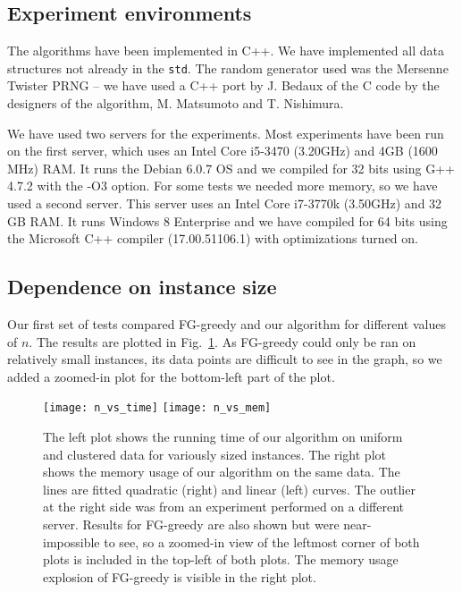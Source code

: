 \documentclass[runningheads,envcountsame,oribibl,orivec]{llncs}
\begin{document}
\subsection{Experiment environments}

The algorithms have been implemented in C++. We have implemented all data structures not already in the \verb|std|. The random generator used was the Mersenne Twister PRNG -- we have used a C++ port by J. Bedaux of the C code by the designers of the algorithm,  M. Matsumoto and T. Nishimura.

We have used two servers for the experiments. Most experiments have been run on the first server, which uses an Intel Core i5-3470 (3.20GHz) and 4GB (1600 MHz) RAM. It runs the Debian 6.0.7 OS and we compiled for 32 bits using G++ 4.7.2 with the -O3 option. For some tests we needed more memory, so we have used a second server. This server uses an Intel Core i7-3770k (3.50GHz) and 32 GB RAM. It runs Windows 8 Enterprise and we have compiled for 64 bits using the Microsoft C++ compiler (17.00.51106.1) with optimizations turned on.

\subsection{Dependence on instance size}

Our first set of tests compared FG-greedy and our algorithm for different values of $n$. The results are plotted in Fig.~\ref{figure:plot}. As FG-greedy could only be ran on relatively small instances, its data points are difficult to see in the graph, so we added a zoomed-in plot for the bottom-left part of the plot.

\begin{figure}[h!]\centering
\texttt{[image: n\_vs\_time]}
\texttt{[image: n\_vs\_mem]}
\caption{The left plot shows the running time of our algorithm on uniform and clustered data for variously sized instances. The right plot shows the memory usage of our algorithm on the same data. The lines are fitted quadratic (right) and linear (left) curves. The outlier at the right side was from an experiment performed on a different server. Results for FG-greedy are also shown but were near-impossible to see, so a zoomed-in view of the leftmost corner of both plots is included in the top-left of both plots. The memory usage explosion of FG-greedy is visible in the right plot.}
\label{figure:plot}
\end{figure}
\end{document}

